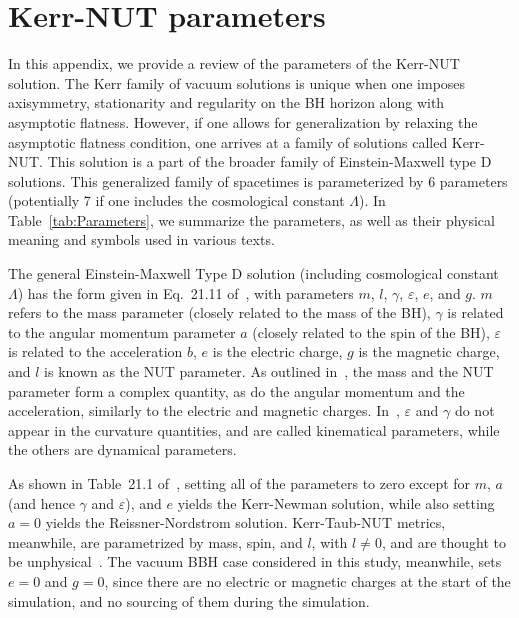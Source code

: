 \appendix

\section{Kerr-NUT parameters}
\label{appendix:KerrNUTParameters}


In this appendix, we provide a review of the parameters of the Kerr-NUT solution. The Kerr family of vacuum solutions is unique when one imposes axisymmetry, stationarity and regularity on the BH horizon along with asymptotic flatness. However, if one allows for generalization by relaxing the asymptotic flatness condition, one arrives at a family of solutions called Kerr-NUT. This solution is a part of the broader family of Einstein-Maxwell type D solutions. This generalized family of spacetimes is parameterized by 6 parameters (potentially 7 if one includes the cosmological constant $\Lambda$). In Table~\ref{tab:Parameters}, we summarize the parameters, as well as their physical meaning and symbols used in various texts.

The general Einstein-Maxwell Type D solution (including cosmological constant $\Lambda$) has the form given in Eq.~21.11 of~\cite{stephani2009exact}, with parameters $m$, $l$, $\gamma$, $\varepsilon$, $e$, and $g$. $m$ refers to the mass parameter (closely related to the mass of the BH), $\gamma$ is related to the angular momentum parameter $a$ (closely related to the spin of the BH), $\varepsilon$ is related to the acceleration $b$, $e$ is the electric charge, $g$ is the magnetic charge, and $l$ is known as the NUT parameter. As outlined in~\cite{PLEBANSKI197698}, the mass and the NUT parameter form a complex quantity, as do the angular momentum and the acceleration, similarly to the electric and magnetic charges. In~\cite{PLEBANSKI197698}, $\varepsilon$ and $\gamma$ do not appear in the curvature quantities, and are called kinematical parameters, while the others are dynamical parameters.

As shown in Table~21.1 of~\cite{stephani2009exact}, setting all of the parameters to zero except for $m$, $a$ (and hence $\gamma$ and $\varepsilon$), and $e$ yields the Kerr-Newman solution, while also setting $a = 0$ yields the Reissner-Nordstrom solution. Kerr-Taub-NUT metrics, meanwhile, are parametrized by mass, spin, and $l$, with $l \neq 0$, and are thought to be unphysical~\cite{kaluzaklein}. The vacuum BBH case considered in this study, meanwhile, sets $e = 0$ and $g = 0$, since there are no electric or magnetic charges at the start of the simulation, and no sourcing of them during the simulation.


